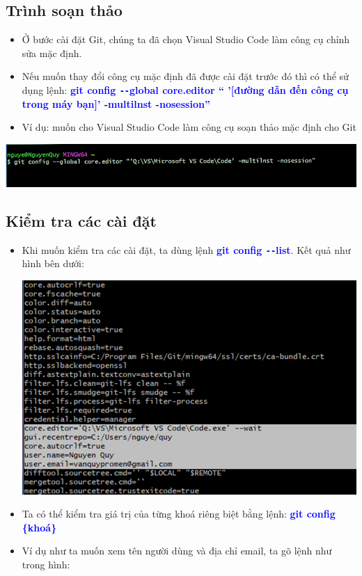\documentclass[12pt,a4paper]{report}
\begin{document}
\subsection{Trình soạn thảo}
\begin{itemize}
\item Ở bước cài đặt Git, chúng ta đã chọn Visual Studio Code làm công cụ chỉnh sửa mặc định.
\item Nếu muốn thay đổi công cụ mặc định đã được cài đặt trước đó thì có thể sử dụng lệnh:
\textcolor{blue}{\bf git config \texttt{-{}-}global core.editor “ ’[đường dẫn đến công cụ trong máy bạn]’ -multilnst -nosession”}
\item Ví dụ: muốn cho Visual Studio Code làm công cụ soạn thảo mặc định cho Git
\end{itemize}
\vskip 0.4cm
\vskip 0.4cm
	\includegraphics[width=0.8\linewidth]{screenshot002}
	\label{fig:screenshot002}
\vskip 0.4cm \vskip 0.4cm
\subsection{Kiểm tra các cài đặt}
\begin{itemize}
\item Khi muốn kiểm tra các cài đặt, ta dùng lệnh \textcolor{blue}{\bf git config \texttt{-{}-}list}. Kết quả như hình bên dưới: 

	\includegraphics[width=0.8\linewidth]{screenshot003}
	\label{fig:screenshot003}
	
\item Ta có thể kiểm tra giá trị của từng khoá riêng biệt bằng lệnh: \textcolor{blue}{\bf git config \{khoá\}}
\item Ví dụ như ta muốn xem tên người dùng và địa chỉ email, ta gõ lệnh như trong hình: 
\end{itemize}
\vskip 0.4cm
\end{document}
